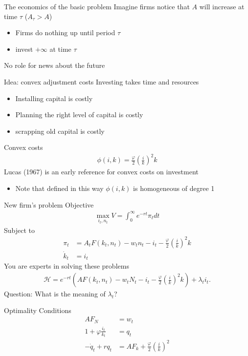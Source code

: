 \documentclass[11pt,aspectratio=169,xcolor={dvipsnames},hyperref={pdftex,pdfpagemode=UseNone,hidelinks,pdfdisplaydoctitle=true},usepdftitle=false]{beamer}
\begin{document}
\begin{frame}{The economics of the basic problem}
Imagine firms notice that $A$ will increase at time $\tau$ ($A_{\tau} > A$)
\begin{itemize}
\item Firms do nothing up until period $\tau$
\item invest $+ \infty$ at time $\tau$
\end{itemize}
No role for news about the future
\end{frame}

\begin{frame}{Idea: convex adjustment costs}
Investing takes time and resources
\pause
\begin{itemize}
\item Installing capital is costly
\item Planning the right level of capital is costly
\item scrapping old capital is costly
\end{itemize}
\pause
Convex costs
\begin{align}
\phi(i,k) = \frac{\varphi}{2} \left(\frac{i}{k}\right)^2 k
\end{align}
Lucas (1967) is an early reference for convex costs on investment
\begin{itemize}
\item Note that defined in this way $\phi(i,k)$ is homogeneous of degree 1
\end{itemize}
\end{frame}

\begin{frame}{New firm's problem}
Objective
\begin{align}
\max_{i_t, n_t} V = \int_0^{\infty} e^{-rt} \pi_t dt
\end{align}
Subject to
\begin{align}
\pi_{t} &= A_t F(k_t,n_t) - w_t n_t - i_t - \frac{\varphi}{2} \left(\frac{i}{k}\right)^2 k \\
\dot{k}_t& = i_t
\end{align}
You are experts in solving these problems
\pause
\begin{align}
\mathcal{H} = e^{-rt} \left(A F(k_t,n_t) - w_t N_t -  i_t - \frac{\varphi}{2} \left(\frac{i}{k}\right)^2 k \right) + \lambda_t i_t.
\end{align}
\pause
Question: What is the meaning of $\lambda_t$?
\end{frame}


\begin{frame}{Optimality Conditions}
\begin{align}
A F_N &= w_t\\
1 + \varphi \frac{i_t}{k_t}  &= q_t\\
-\dot{q}_t + r q_t &= AF_k + \frac{\varphi}{2}\left(\frac{i}{k}\right)^2
\end{align}
\end{frame}
\end{document}
